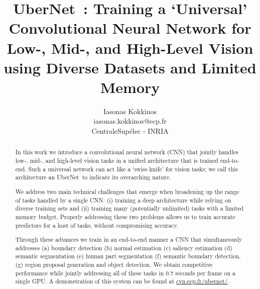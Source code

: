\documentclass[10pt,twocolumn,letterpaper]{article}
\begin{document}
\newcommand{\ubernet}{UberNet~}
\title{\ubernet: Training a `Universal' Convolutional Neural Network for Low-, Mid-, and High-Level Vision using Diverse Datasets and   Limited Memory}
	\author{Iasonas Kokkinos\\
	iasonas.kokkinos@ecp.fr\\
	CentraleSup\'elec - INRIA 
	}
	
	\sloppy
	\maketitle
	\thispagestyle{empty}
	
\begin{abstract}
In this work we  introduce a convolutional neural network (CNN) that jointly handles low-, mid-, and high-level vision tasks in a  unified architecture that is trained end-to-end.  Such a universal  network can act like a `swiss knife' for vision tasks;  we call this architecture an \ubernet to indicate its overarching nature. 
	
We address two main technical challenges that emerge when broadening up the range of tasks handled by a single CNN: (i) training a deep architecture while relying on diverse training sets and (ii) training many (potentially unlimited) tasks with a limited memory budget.
Properly addressing these two problems allows us to train  accurate predictors for a host of tasks, without compromising accuracy. 

Through these advances we train in an end-to-end manner a CNN that  simultaneously addresses (a) boundary detection (b) normal estimation (c) saliency estimation (d) semantic segmentation (e) human part segmentation (f) semantic boundary detection, (g) region proposal generation and object detection. We obtain competitive performance while jointly addressing all of these tasks in 0.7 seconds per frame on a single GPU. A demonstration  of this system can be found at \url{cvn.ecp.fr/ubernet/}.
\end{abstract}
\maketitle

\noindent


\newcommand{\rt}{.}
\newcommand{\wdtg}{.485\linewidth}
\end{document}
